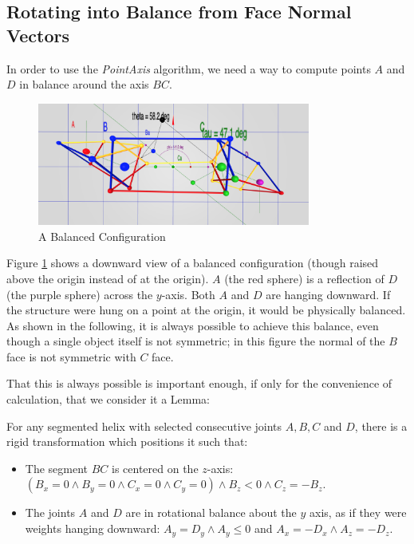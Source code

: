 \documentclass{svproc}
\begin{document}
\subsection{Rotating into Balance from Face Normal Vectors}

\label{sec:balance}

In order to use the {\em PointAxis} algorithm, we need a way
to compute points $A$ and $D$ in balance around the axis $BC$.

\begin{figure}
     \centering
     \includegraphics[width=0.80\textwidth]{figures/Balance.png}
     \caption{A Balanced Configuration}
  \label{fig:balancediagram}
\end{figure}


Figure \ref{fig:balancediagram} shows a downward view of a
balanced configuration (though raised above the origin
instead of at the origin).
$A$ (the red sphere) is a reflection of $D$ (the purple sphere) across
the $y$-axis.
Both $A$ and $D$ are hanging downward.
If the structure were hung on a point at the origin, it would
be physically balanced.
As shown in the following, it is always possible to achieve this balance,
even though a single object
itself is not symmetric; in this figure the normal of the $B$ face is not symmetric with $C$ face.

That this is always possible is important enough, if only for
the convenience of calculation, that we consider it a Lemma:
\begin{lemma}
  For any segmented helix with selected consecutive joints $A,B,C$ and $D$,
  there is a rigid transformation which positions it such that:
  \begin{itemize}
  \item The segment $BC$ is centered on the $z$-axis:
    $(B_x = 0 \wedge B_y = 0 \wedge C_x = 0 \wedge C_y = 0)
    \wedge B_z < 0 \wedge C_z = -B_z$.
  \item The joints $A$ and $D$ are in rotational balance about
    the $y$ axis, as if they were weights hanging downward:
    $A_y = D_y \wedge A_y \leq 0 $ and
    $A_x = -D_x \wedge A_z = -D_z$.
  \end{itemize}
  \label{lem:balance}
\end{lemma}
\end{document}
